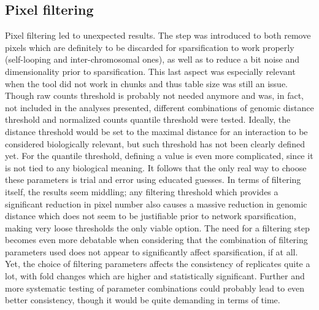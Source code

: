 \subsection{Pixel filtering}
Pixel filtering led to unexpected results. The step was introduced to both remove pixels which are definitely to be discarded for sparsification to work properly (self-looping and inter-chromosomal ones), as well as to reduce a bit noise and dimensionality prior to sparsification. This last aspect was especially relevant when the tool did not work in chunks and thus table size was still an issue. Though raw counts threshold is probably not needed anymore and was, in fact, not included in the analyses presented, different combinations of genomic distance threshold and normalized counts quantile threshold were tested. Ideally, the distance threshold would be set to the maximal distance for an interaction to be considered biologically relevant, but such threshold has not been clearly defined yet. For the quantile threshold, defining a value is even more complicated, since it is not tied to any biological meaning. It follows that the only real way to choose these parameters is trial and error using educated guesses. In terms of filtering itself, the results seem middling; any filtering threshold which provides a significant reduction in pixel number also causes a massive reduction in genomic distance which does not seem to be justifiable prior to network sparsification, making very loose thresholds the only viable option. The need for a filtering step becomes even more debatable when considering that the combination of filtering parameters used does not appear to significantly affect sparsification, if at all. Yet, the choice of filtering parameters affects the consistency of replicates quite a lot, with fold changes which are higher and statistically significant. Further and more systematic testing of parameter combinations could probably lead to even better consistency, though it would be quite demanding in terms of time.

